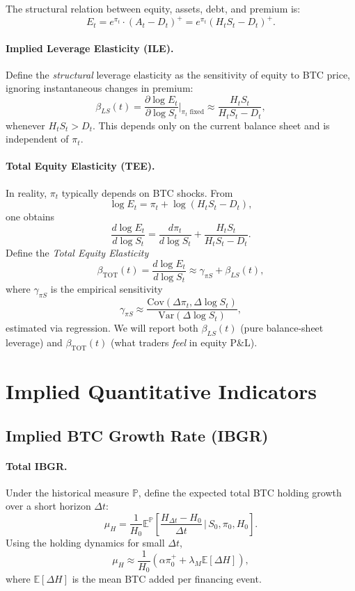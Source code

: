 \documentclass[11pt]{article}
\begin{document}
The structural relation between equity, assets, debt, and premium is:
$$
  E_t = e^{\pi_t} \cdot (A_t - D_t)^+ = e^{\pi_t} (H_t S_t - D_t)^+.
$$

\paragraph{Implied Leverage Elasticity (ILE).}
Define the \emph{structural} leverage elasticity as the sensitivity of equity to BTC price, ignoring instantaneous changes in premium:
$$
  \beta_{LS}(t)
  = \frac{\partial \log E_t}{\partial \log S_t}\bigg|_{\pi_t \text{ fixed}}
  \approx \frac{H_t S_t}{H_t S_t - D_t},
$$
whenever $H_t S_t > D_t$.
This depends only on the current balance sheet and is independent of $\pi_t$.

\paragraph{Total Equity Elasticity (TEE).}
In reality, $\pi_t$ typically depends on BTC shocks. From
$$
  \log E_t = \pi_t + \log(H_t S_t - D_t),
$$
one obtains
$$
  \frac{d \log E_t}{d \log S_t}
  = \frac{d \pi_t}{d \log S_t}
    + \frac{H_t S_t}{H_t S_t - D_t}.
$$
Define the \emph{Total Equity Elasticity}
$$
  \beta_{\text{TOT}}(t)
  = \frac{d \log E_t}{d \log S_t}
  \approx \gamma_{\pi S} + \beta_{LS}(t),
$$
where $\gamma_{\pi S}$ is the empirical sensitivity
$$
  \gamma_{\pi S} \approx
  \frac{\text{Cov}(\Delta \pi_t, \Delta \log S_t)}{\text{Var}(\Delta \log S_t)},
$$
estimated via regression.
We will report both $\beta_{LS}(t)$ (pure balance-sheet leverage) and $\beta_{\text{TOT}}(t)$ (what traders \emph{feel} in equity P\&L).

\section{Implied Quantitative Indicators}

\subsection{Implied BTC Growth Rate (IBGR)}

\paragraph{Total IBGR.}
Under the historical measure $\mathbb P$, define the expected total BTC holding growth over a short horizon $\Delta t$:
$$
  \mu_H
  = \frac{1}{H_0}
    \mathbb E^\mathbb P
    \left[
      \frac{H_{\Delta t} - H_0}{\Delta t}
      \,\bigg|\,
      S_0, \pi_0, H_0
    \right].
$$
Using the holding dynamics for small $\Delta t$,
$$
  \mu_H \approx
  \frac{1}{H_0}
  \left(
    \alpha \pi_0^+ + \lambda_M \mathbb E[\Delta H]
  \right),
$$
where $\mathbb E[\Delta H]$ is the mean BTC added per financing event.
\end{document}
